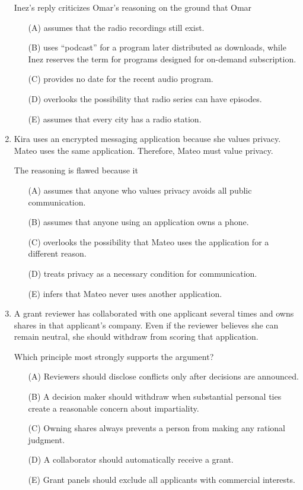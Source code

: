 \begin{enumerate}
Inez's reply criticizes Omar's reasoning on the ground that Omar
\begin{enumerate}
\item[(A)] assumes that the radio recordings still exist.
\item[(B)] uses ``podcast'' for a program later distributed as downloads, while Inez reserves the term for programs designed for on-demand subscription.
\item[(C)] provides no date for the recent audio program.
\item[(D)] overlooks the possibility that radio series can have episodes.
\item[(E)] assumes that every city has a radio station.
\end{enumerate}

\item Kira uses an encrypted messaging application because she values privacy. Mateo uses the same application. Therefore, Mateo must value privacy.

The reasoning is flawed because it
\begin{enumerate}
\item[(A)] assumes that anyone who values privacy avoids all public communication.
\item[(B)] assumes that anyone using an application owns a phone.
\item[(C)] overlooks the possibility that Mateo uses the application for a different reason.
\item[(D)] treats privacy as a necessary condition for communication.
\item[(E)] infers that Mateo never uses another application.
\end{enumerate}

\item A grant reviewer has collaborated with one applicant several times and owns shares in that applicant's company. Even if the reviewer believes she can remain neutral, she should withdraw from scoring that application.

Which principle most strongly supports the argument?
\begin{enumerate}
\item[(A)] Reviewers should disclose conflicts only after decisions are announced.
\item[(B)] A decision maker should withdraw when substantial personal ties create a reasonable concern about impartiality.
\item[(C)] Owning shares always prevents a person from making any rational judgment.
\item[(D)] A collaborator should automatically receive a grant.
\item[(E)] Grant panels should exclude all applicants with commercial interests.
\end{enumerate}


\end{enumerate}
